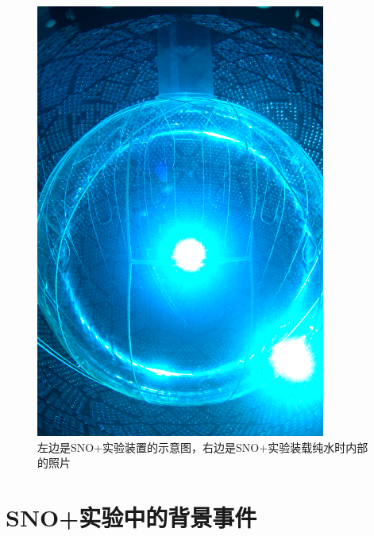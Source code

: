 \begin{figure}[htbp]
\begin{minipage}[htbp]{0.45\textwidth}
        \includegraphics[width=0.85\textwidth]{figures/photograph.png}
    \end{minipage}
    \caption{左边是SNO+实验装置的示意图\cite{andringa2016current}，右边是SNO+实验装载纯水时内部的照片\cite{andringa2016current}}
    \label{fig:sno+facility}
\end{figure}

\section{SNO+实验中的背景事件}\label{background}

